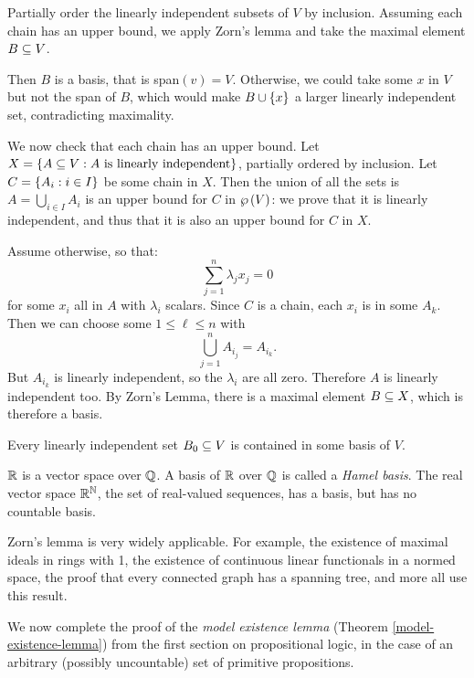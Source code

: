 \documentclass{article}
\begin{document}
\begin{prf}
    Partially order the linearly independent subsets of $V$ by inclusion. Assuming each chain has an upper bound, we apply Zorn's lemma and take the maximal element $B \subseteq V$.
    
    Then $B$ is a basis, that is span$(v) = V$. Otherwise, we could take some $x$ in $V$ but not the span of $B$, which would make $B \cup \left\lbrace x \right\rbrace$ a larger linearly independent set, contradicting maximality.
    
    We now check that each chain has an upper bound. Let $X = \left\lbrace A \subseteq V : A \text{ is linearly independent} \right\rbrace$, partially ordered by inclusion. Let $C = \left\lbrace A_i : i \in I \right\rbrace$ be some chain in $X$. Then the union of all the sets is $A = \bigcup_{i \in I} A_i$ is an upper bound for $C$ in $\wp\left(V\right)$: we prove that it is linearly independent, and thus that it is also an upper bound for $C$ in $X$.
    
    Assume otherwise, so that:
    \[
	\sum_{j=1}^n \lambda_j x_j = 0
	\]
	for some $x_i$ all in $A$ with $\lambda_i$ scalars. Since $C$ is a chain, each $x_i$ is in some $A_k$. Then we can choose some $1 \leq \ell \leq n$ with
	\[
	\bigcup_{j=1}^n A_{i_j} = A_{i_k}.
	\]
	But $A_{i_k}$ is linearly independent, so the $\lambda_i$ are all zero. Therefore $A$ is linearly independent too. By Zorn's Lemma, there is a maximal element $B \subseteq X$, which is therefore a basis.
\end{prf}

\begin{corollary}
	Every linearly independent set $B_0 \subseteq V$ is contained in some basis of $V$.
\end{corollary}

\begin{note}
	$\mathbb{R}$ is a vector space over $\mathbb{Q}$. A basis of $\mathbb{R}$ over $\mathbb{Q}$ is called a \textit{Hamel basis}. The real vector space $\mathbb{R}^{\mathbb{N}}$, the set of real-valued sequences, has a basis, but has no countable basis.
\end{note}

\begin{note}
	Zorn's lemma is very widely applicable. For example, the existence of maximal ideals in rings with 1, the existence of continuous linear functionals in a normed space, the proof that every connected graph has a spanning tree, and more all use this result.
\end{note}

We now complete the proof of the \textit{model existence lemma} (Theorem \ref{model-existence-lemma}) from the first section on propositional logic, in the case of an arbitrary (possibly uncountable) set of primitive propositions.
\end{document}
